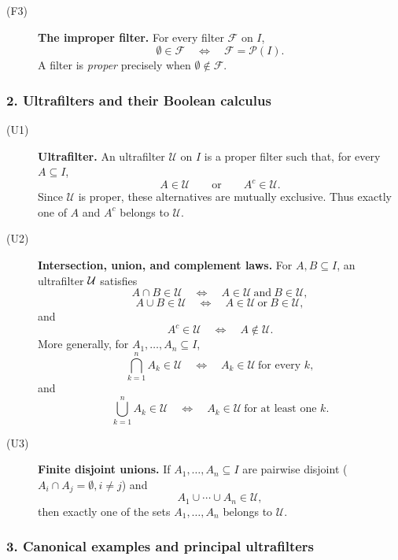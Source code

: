 {\begin{description}
    \item[\textnormal{(F3)}] \textbf{The improper filter.}
    For every filter \(\mathcal{F}\) on \(I\),
    \[
    \emptyset\in\mathcal{F}
    \quad\Longleftrightarrow\quad
    \mathcal{F}=\mathcal{P}(I).
    \]
    A filter is \emph{proper} precisely when
    \(\emptyset\notin\mathcal{F}\).
\end{description}

\subsubsection*{2. Ultrafilters and their Boolean calculus}

\begin{description}
    \item[\textnormal{(U1)}] \textbf{Ultrafilter.}
    An ultrafilter \(\mathcal{U}\) on \(I\) is a proper filter such that, for
    every \(A\subseteq I\),
    \[
    A\in\mathcal{U}
    \qquad\text{or}\qquad
    A^c\in\mathcal{U}.
    \]
    Since \(\mathcal{U}\) is proper, these alternatives are mutually
    exclusive. Thus exactly one of \(A\) and \(A^c\) belongs to
    \(\mathcal{U}\).

    \item[\textnormal{(U2)}] \textbf{Intersection, union, and complement laws.}
    For \(A,B\subseteq I\), an ultrafilter $\mathcal{U}$ satisfies
    \[
    A\cap B\in\mathcal{U}
    \quad\Longleftrightarrow\quad
    A\in\mathcal{U}\ \text{and}\ B\in\mathcal{U},
    \]
    \[
    A\cup B\in\mathcal{U}
    \quad\Longleftrightarrow\quad
    A\in\mathcal{U}\ \text{or}\ B\in\mathcal{U},
    \]
    and
    \[
    A^c\in\mathcal{U}
    \quad\Longleftrightarrow\quad
    A\notin\mathcal{U}.
    \]
    More generally, for \(A_1,\ldots,A_n\subseteq I\),
    \[
    \bigcap_{k=1}^{n}A_k\in\mathcal{U}
    \quad\Longleftrightarrow\quad
    A_k\in\mathcal{U}\ \text{for every }k,
    \]
    and
    \[
    \bigcup_{k=1}^{n}A_k\in\mathcal{U}
    \quad\Longleftrightarrow\quad
    A_k\in\mathcal{U}\ \text{for at least one }k.
    \]

    \item[\textnormal{(U3)}] \textbf{Finite disjoint unions.}
    If \(A_1,\ldots,A_n\subseteq I\) are pairwise disjoint ($A_i \cap A_j = \emptyset, i\neq j$) and
    \[
    A_1\cup\cdots\cup A_n\in\mathcal{U},
    \]
    then exactly one of the sets \(A_1,\ldots,A_n\) belongs to
    \(\mathcal{U}\).
\end{description}

\subsubsection*{3. Canonical examples and principal ultrafilters}

}
